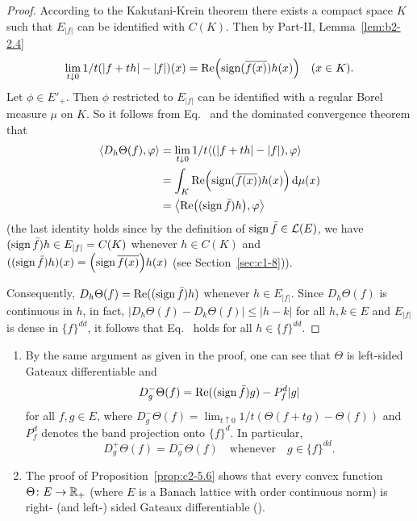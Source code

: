 \begin{proof}
According to the Kakutani-Krein theorem there exists a compact space
$K$ such that $E_{|f|}$ can be identified with $C(K)$. Then by Part-II, Lemma~\ref{lem:b2-2.4}
\begin{equation}\label{eq:c2-5.9}
\lim_{t \downarrow 0} 1/t(|f+th| - |f|)(x) = \Re\mleft(\sign (\overline{f(x)})h(x)\mright) \quad (x \in K).
\end{equation}
Let $\phi \in E'_{+}$. Then $\phi$ restricted to $E_{|f|}$ can be identified with a regular Borel measure $\mu$ on $K$.
So it follows from Eq.~ and the dominated convergence theorem that
\begin{align*}
\langle D_{h}\Theta(f),\phi \rangle &= \lim_{t \downarrow 0} 1/t \langle(|f + th| - |f|),\phi \rangle\\
&= \int_{K} \Re\mleft(\sign(\overline{f(x)})h(x)\mright) \diff{\mu(x)} \\
&= \mleft\langle\Re\mleft((\sign  \bar{f})h\mright),\phi\mright\rangle
\end{align*}
(the last identity holds since by the definition of\/ $\operatorname{sign}  \bar{f} \in \mathcal{L}(E)$,
we have $(\operatorname{sign}  \bar{f})h \in E_{|f|} = C(K)$ whenever $h \in C(K)$ and
$((\sign  \bar{f})h)(x) = \mleft(\sign  \overline{f(x)}\mright)h(x)$  
(see Section~\ref{sec:c1-8})).

Consequently, $D_{h}\Theta(f) = \mathop{}\!\mathrm{Re}((\operatorname{sign} \bar{f})h)$ whenever $h \in E_{|f|}$. 
Since $D_{h}\Theta(f)$ is continuous in $h$, in fact, $|D_{h}\Theta(f) - D_{k}\Theta(f)| \leq |h - k|$ for all $h,k \in E$ and $E_{|f|}$ is dense in $\{f\}^{dd}$, it follows that Eq.~ holds for all $h \in \{f\}^{dd}$.
\end{proof}
\begin{remark}\label{rem:c2-5.7} 
\begin{enumerate}[\upshape (i), wide, labelindent=.25em] %
\item \label{rem:c2-5.7-1}
By the same argument as given in the proof, one can see
that $\Theta$ is left-sided Gateaux differentiable and
\begin{equation*}
D^{-}_{g}\Theta(f) = \mathop{}\!\mathrm{Re}((\operatorname{sign}  \bar{f})g) - P^{d}_{f}|g|
\end{equation*}
for all $f, g \in E$, where $D^{-}_{g}\Theta(f) = \lim_{t \uparrow 0} 1/t(\Theta(f + tg) - \Theta(f))$ and
$P^{d}_{f}$ denotes the band projection onto $\{f\}^{d}$. 
In particular,
\begin{equation}\label{eq:c2-5.10}
D^{+}_{g}\Theta(f) = D^{-}_{g}\Theta(f) \quad \text{whenever} \quad g \in \{f\}^{dd}.
\end{equation}
\item \label{rem:c2-5.7-2}
The proof of  Proposition~\ref{prop:c2-5.6}   shows that every convex function $\Theta \colon E \to \mathbb{R}_{+}$
(where $E$ is a Banach lattice with order continuous norm) is right- (and left-) sided Gateaux differentiable (\cf \textcite{ arendt:1982}).
\end{enumerate}
\end{remark}
